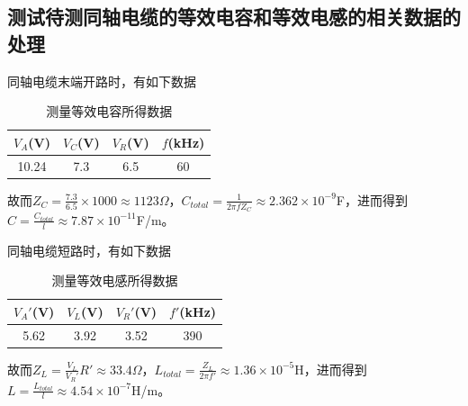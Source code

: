 \documentclass[UTF8]{ctexart}
\begin{document}
\subsection{测试待测同轴电缆的等效电容和等效电感的相关数据的处理}
同轴电缆末端开路时，有如下数据
    \begin{table}[H]
\centering
    \caption{测量等效电容所得数据}  
    \begin{tabular}{|c|c|c|c|}
    \hline  
    $V_A$(V) & $V_C$(V)  &$V_R$(V) &$f$(kHz) \\  
    \hline  
    10.24  & 7.3 & 6.5&60 \\  
    \hline  
    \end{tabular}  
    \end{table}  

故而$Z_C=\frac{7.3}{6.5}\times1000\approx1123\Omega$，$C_{total}=\frac{1}{2\pi fZ_C}\approx2.362\times10^{-9}$F，进而得到$C=\frac{C_{total}}{l}\approx7.87\times10^{-11}$F/m。

同轴电缆短路时，有如下数据
    \begin{table}[H]
\centering
    \caption{测量等效电感所得数据}  
    \begin{tabular}{|c|c|c|c|}
    \hline  
    $V_A'$(V) & $V_L$(V)  &$V_R'$(V) &$f'$(kHz) \\  
    \hline  
    5.62  & 3.92 & 3.52 & 390 \\  
    \hline  
    \end{tabular}  
    \end{table} 

故而$Z_L=\frac{V_L}{V_R'}R'\approx33.4\Omega$，$L_{total}=\frac{Z_L}{2\pi f'}\approx1.36\times10^{-5}$H，进而得到$L=\frac{L_{total}}{l}\approx4.54\times10^{-7}$H/m。
\end{document}
